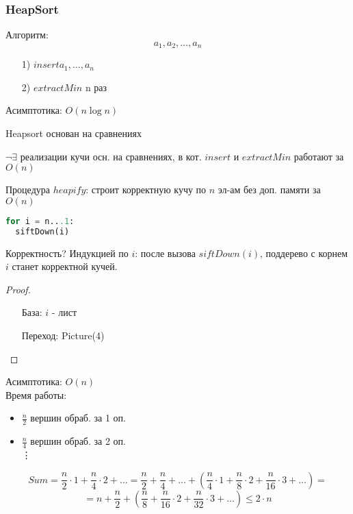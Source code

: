 \subsubsection{HeapSort}
Алгоритм:
\[
a_1, a_2, \ldots, a_n
\]
\begin{itemize}
  \item [1) ] $insert a_1, \ldots, a_n$ 
  \item [2) ] $extractMin \text{ n раз}$ \end{itemize}
Асимптотика: $O(n\log n)$
\begin{note}
Heapsort основан на сравнениях
\end{note}
\begin{consequence}
$\neg\exists$ реализации кучи осн. на сравнениях, в кот. $insert$ и $extractMin$ работают за $O(n)$
\end{consequence}
Процедура $heapify$: строит корректную кучу по $n$ эл-ам без доп. памяти за $O(n)$
\lstset{style=mystyle}
\begin{lstlisting}[language=Python, caption=Heapify]
for i = n...1:
  siftDown(i)
\end{lstlisting}
Корректность? Индукцией по $i$: после вызова $siftDown(i)$, поддерево с корнем $i$ станет корректной кучей.
\begin{proof}
\begin{itemize}
  \item [База:] $i$ - лист
  \item [Переход:] Picture(4)
\end{itemize}
\end{proof}
Асимптотика: $O(n)$ \\
Время работы:
\begin{itemize}
  \item $\frac{n}{2}$ вершин обраб. за 1 оп.
  \item $\frac{n}{4}$ вершин обраб. за 2 оп.\\
    \vdots
\end{itemize}
\[
Sum = \frac{n}{2} \cdot 1 + \frac{n}{4} \cdot 2 + \ldots = \frac{n}{2} + \frac{n}{4} + \ldots + (\frac{n}{4} \cdot 1 + \frac{n}{8} \cdot 2 + \frac{n}{16} \cdot 3 + \ldots) =
\]
\[
= n + \frac{n}{2} + (\frac{n}{8} + \frac{n}{16} \cdot 2 + \frac{n}{32} \cdot 3 + \ldots) \leq 2 \cdot n
\]
